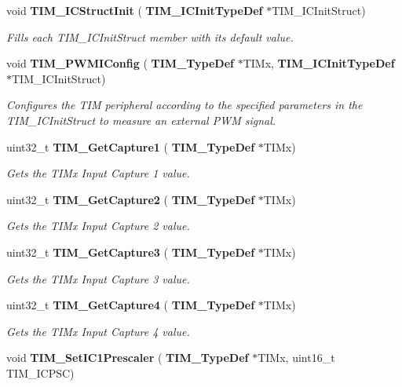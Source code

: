 \begin{DoxyCompactItemize}
void \textbf{ T\+I\+M\+\_\+\+I\+C\+Struct\+Init} (\textbf{ T\+I\+M\+\_\+\+I\+C\+Init\+Type\+Def} $\ast$T\+I\+M\+\_\+\+I\+C\+Init\+Struct)
\begin{DoxyCompactList}\small\item\em Fills each T\+I\+M\+\_\+\+I\+C\+Init\+Struct member with its default value. \end{DoxyCompactList}\item 
void \textbf{ T\+I\+M\+\_\+\+P\+W\+M\+I\+Config} (\textbf{ T\+I\+M\+\_\+\+Type\+Def} $\ast$T\+I\+Mx, \textbf{ T\+I\+M\+\_\+\+I\+C\+Init\+Type\+Def} $\ast$T\+I\+M\+\_\+\+I\+C\+Init\+Struct)
\begin{DoxyCompactList}\small\item\em Configures the T\+IM peripheral according to the specified parameters in the T\+I\+M\+\_\+\+I\+C\+Init\+Struct to measure an external P\+WM signal. \end{DoxyCompactList}\item 
uint32\+\_\+t \textbf{ T\+I\+M\+\_\+\+Get\+Capture1} (\textbf{ T\+I\+M\+\_\+\+Type\+Def} $\ast$T\+I\+Mx)
\begin{DoxyCompactList}\small\item\em Gets the T\+I\+Mx Input Capture 1 value. \end{DoxyCompactList}\item 
uint32\+\_\+t \textbf{ T\+I\+M\+\_\+\+Get\+Capture2} (\textbf{ T\+I\+M\+\_\+\+Type\+Def} $\ast$T\+I\+Mx)
\begin{DoxyCompactList}\small\item\em Gets the T\+I\+Mx Input Capture 2 value. \end{DoxyCompactList}\item 
uint32\+\_\+t \textbf{ T\+I\+M\+\_\+\+Get\+Capture3} (\textbf{ T\+I\+M\+\_\+\+Type\+Def} $\ast$T\+I\+Mx)
\begin{DoxyCompactList}\small\item\em Gets the T\+I\+Mx Input Capture 3 value. \end{DoxyCompactList}\item 
uint32\+\_\+t \textbf{ T\+I\+M\+\_\+\+Get\+Capture4} (\textbf{ T\+I\+M\+\_\+\+Type\+Def} $\ast$T\+I\+Mx)
\begin{DoxyCompactList}\small\item\em Gets the T\+I\+Mx Input Capture 4 value. \end{DoxyCompactList}\item 
void \textbf{ T\+I\+M\+\_\+\+Set\+I\+C1\+Prescaler} (\textbf{ T\+I\+M\+\_\+\+Type\+Def} $\ast$T\+I\+Mx, uint16\+\_\+t T\+I\+M\+\_\+\+I\+C\+P\+SC)

\end{DoxyCompactItemize}

